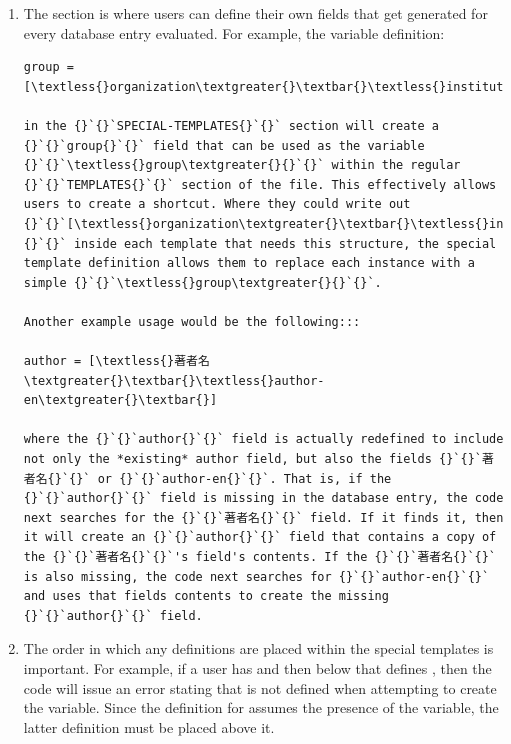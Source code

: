 \documentclass[letterpaper,10pt,english]{sphinxmanual}
\begin{document}
\begin{enumerate}
\item {} 
The  section is where users can define their own fields that get generated for every database entry evaluated. For example, the variable definition:

\begin{Verbatim}[commandchars=\\\{\}]
group = [\textless{}organization\textgreater{}\textbar{}\textless{}institution\textgreater{}\textbar{}\textless{}corporation\textgreater{}\textbar{}]

in the {}`{}`SPECIAL-TEMPLATES{}`{}` section will create a {}`{}`group{}`{}` field that can be used as the variable {}`{}`\textless{}group\textgreater{}{}`{}` within the regular {}`{}`TEMPLATES{}`{}` section of the file. This effectively allows users to create a shortcut. Where they could write out {}`{}`[\textless{}organization\textgreater{}\textbar{}\textless{}institution\textgreater{}\textbar{}\textless{}corporation\textgreater{}\textbar{}]{}`{}` inside each template that needs this structure, the special template definition allows them to replace each instance with a simple {}`{}`\textless{}group\textgreater{}{}`{}`.

Another example usage would be the following:::

author = [\textless{}著者名\textgreater{}\textbar{}\textless{}author-en\textgreater{}\textbar{}]

where the {}`{}`author{}`{}` field is actually redefined to include not only the *existing* author field, but also the fields {}`{}`著者名{}`{}` or {}`{}`author-en{}`{}`. That is, if the {}`{}`author{}`{}` field is missing in the database entry, the code next searches for the {}`{}`著者名{}`{}` field. If it finds it, then it will create an {}`{}`author{}`{}` field that contains a copy of the {}`{}`著者名{}`{}`'s field's contents. If the {}`{}`著者名{}`{}` is also missing, the code next searches for {}`{}`author-en{}`{}` and uses that fields contents to create the missing {}`{}`author{}`{}` field.
\end{Verbatim}

\item {} 
The order in which any definitions are placed within the special templates is important. For example, if a user has  and then below that defines , then the code will issue an error stating that  is not defined when attempting to create the  variable. Since the definition for  assumes the presence of the  variable, the latter definition must be placed above it.

\end{enumerate}
\end{document}
